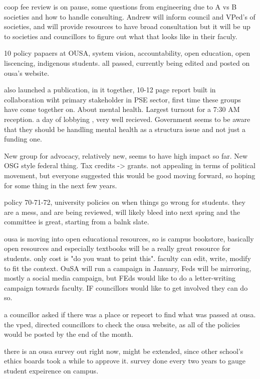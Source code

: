 \begin{information}
    coop fee review is on pause, some questions from engineering due to
    A vs B societies and how to handle consulting. Andrew will inform council
    and VPed's of societies, and will provide resources to have broad consultation
    but it will be up to societies and councillors to figure out what that
    looks like in their faculy. 

    10 policy papaers at OUSA, system vision, accountability, open education,
    open liscencing, indigenous students. all passed, currently being edited
    and posted on ousa's website. 

    also launched a publication, in it together, 10-12 page report built in
    collaboration wiht primary stakeholder in PSE sector, first time these
    groups have come together on. About mental health. Largest turnout for a
    7:30 AM reception. a day of lobbying , very well recieved. Government
    seems to be aware that they should be handling mental health as a structura
    issue and not just a funding one.

    New group for advocacy, relatively new, seems to have high impact so far. 
    New OSG style federal thing. Tax credits -> grants. not appealing in
    terms of political movement, but everyone suggested this would be good
    moving forward, so hoping for some thing in the next few years. 

    policy 70-71-72, university policies on when things go wrong for students.
    they are a mess, and are being reviewed, will likely bleed into next
    spring and the committee is great, starting from a balnk slate. 

    ousa is moving into open educational resources, so is campus bookstore, 
    basically open resources and especially textbooks will be a really great
    resource for students. only cost is "do you want to print this". faculty
    can edit, write, modify to fit the context. OuSA will run a campaign in
    January, Feds will be mirroring, mostly a social media campaign, but FEds
    would like to do a letter-writing campaign towards faculty. IF councillors
    would like to get involved they can do so.

    a councillor asked if there was a place or repeort to find what was passed
    at ousa. 
    the vped, directed councillors to check the ousa website, as all of the 
    policies would be posted by the end of the month.

    there is an ousa survey out right now, might be extended, since other
    school's ethics boards took a while to approve it. survey done 
    every two years to gauge student expeirence on campus. 

\end{information}


